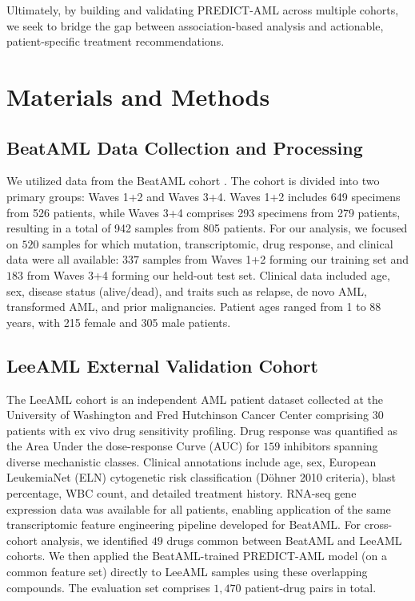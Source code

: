 \documentclass[pdflatex,sn-mathphys-num]{sn-jnl}
\theoremstyle{thmstyleone}
\theoremstyle{thmstyletwo}
\theoremstyle{thmstylethree}
\begin{document}
Ultimately, by building and validating PREDICT-AML across multiple cohorts, we seek to bridge the gap between association-based analysis and actionable, patient-specific treatment recommendations.

\section{Materials and Methods}\label{sec2}

\subsection{BeatAML Data Collection and Processing}\label{sec2.1}
We utilized data from the BeatAML cohort \cite{bottomly2022integrative}. The cohort is divided into two primary groups: Waves 1+2 and Waves 3+4. Waves 1+2 includes 649 specimens from 526 patients, while Waves 3+4 comprises 293 specimens from 279 patients, resulting in a total of 942 samples from 805 patients. For our analysis, we focused on $520$ samples for which mutation, transcriptomic, drug response, and clinical data were all available: $337$ samples from Waves 1+2 forming our training set and $183$ from Waves 3+4 forming our held-out test set. Clinical data included age, sex, disease status (alive/dead), and traits such as relapse, de novo AML, transformed AML, and prior malignancies. Patient ages ranged from 1 to 88 years, with 215 female and 305 male patients.

\subsection{LeeAML External Validation Cohort}\label{sec2.2}
The LeeAML cohort \cite{lee2018machine} is an independent AML patient dataset collected at the University of Washington and Fred Hutchinson Cancer Center comprising $30$ patients with ex vivo drug sensitivity profiling. Drug response was quantified as the Area Under the dose-response Curve (AUC) for $159$ inhibitors spanning diverse mechanistic classes. Clinical annotations include age, sex, European LeukemiaNet (ELN) cytogenetic risk classification (Döhner 2010 criteria), blast percentage, WBC count, and detailed treatment history. RNA-seq gene expression data was available for all patients, enabling application of the same transcriptomic feature engineering pipeline developed for BeatAML. For cross-cohort analysis, we identified $49$ drugs common between BeatAML and LeeAML cohorts. We then applied the BeatAML-trained PREDICT-AML model (on a common feature set) directly to LeeAML samples using these overlapping compounds. The evaluation set comprises $1{,}470$ patient-drug pairs in total.
\end{document}
